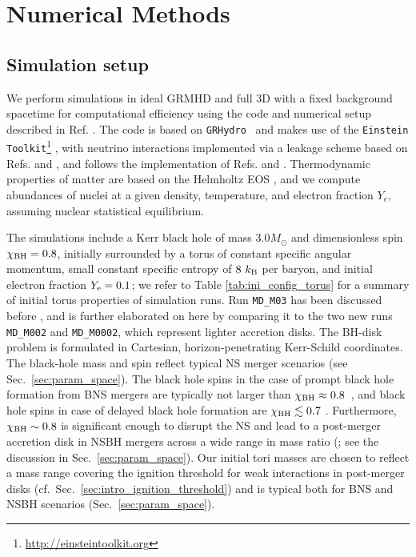 \section{Numerical Methods}
\label{sec:methods}

\subsection{Simulation setup}\label{subsec:sim_setup}
We perform simulations in ideal GRMHD and full 3D with a fixed background spacetime for computational efficiency using the code and numerical setup described in Ref. \cite{Siegel:2017jug}. The code is based on \texttt{GRHydro}~\cite{mosta_grhydro:_2014} and makes use of the \texttt{Einstein Toolkit}\footnote{\href{http://einsteintoolkit.org}{http://einsteintoolkit.org}} \cite{maria_babiuc-hamilton_einstein_2019,loffler_einstein_2012,Schnetter:2003rb,Goodale:2002a,Thornburg:2003sf}, with neutrino interactions implemented via a leakage scheme based on Refs. \cite{bruenn_stellar_1985} and \cite{ruffert_coalescing_1996}, and follows the implementation of Refs. \cite{galeazzi_implementation_2013} and \cite{radice_dynamical_2016}. Thermodynamic properties of matter are based on the Helmholtz EOS \cite{timmes_accuracy_1999,timmes_accuracy_2000}, and we compute abundances of nuclei at a given density, temperature, and electron fraction $Y_e$, assuming nuclear statistical equilibrium.

The simulations include a Kerr black hole of mass $3.0 M_\odot$ and dimensionless spin $\chi_{\rm BH} = 0.8$, initially surrounded by a torus of constant specific angular momentum, small constant specific entropy of $8~k_{\rm B}$ per baryon, and initial electron fraction $Y_{\rm e} = 0.1$; we refer to Table \ref{tab:ini_config_torus} for a summary of initial torus properties of simulation runs. Run \texttt{MD\_M03} has been discussed before \cite{siegel_three-dimensional_2017,Siegel:2017jug}, and is further elaborated on here by comparing it to the two new runs \texttt{MD\_M002} and \texttt{MD\_M0002}, which represent lighter accretion disks. The BH-disk problem is formulated in Cartesian, horizon-penetrating Kerr-Schild coordinates. The black-hole mass and spin reflect typical NS merger scenarios (see Sec.~\ref{sec:param_space}). The black hole spins in the case of prompt black hole formation from BNS mergers are typically not larger than $\chi_{\rm BH} \approx 0.8$~\cite{kiuchi_longterm_2009,rezzolla_accurate_2010,bernuzzi_mergers_2014,kastaun_black_2013}, and black hole spins in case of delayed black hole formation are $\chi_{\rm BH} \lesssim 0.7$ \cite{sekiguchi_dynamical_2016}. Furthermore, $\chi_{\rm BH} \sim 0.8$ is significant enough to disrupt the NS and lead to a post-merger accretion disk in NSBH mergers across a wide range in mass ratio (\cite{foucart_black-hole-neutron-star_2012}; see the discussion in Sec.~\ref{sec:param_space}). Our initial tori masses are chosen to reflect a mass range covering the ignition threshold for weak interactions in post-merger disks (cf.~Sec.~\ref{sec:intro_ignition_threshold}) and is typical both for BNS and NSBH scenarios (Sec.~\ref{sec:param_space}).

